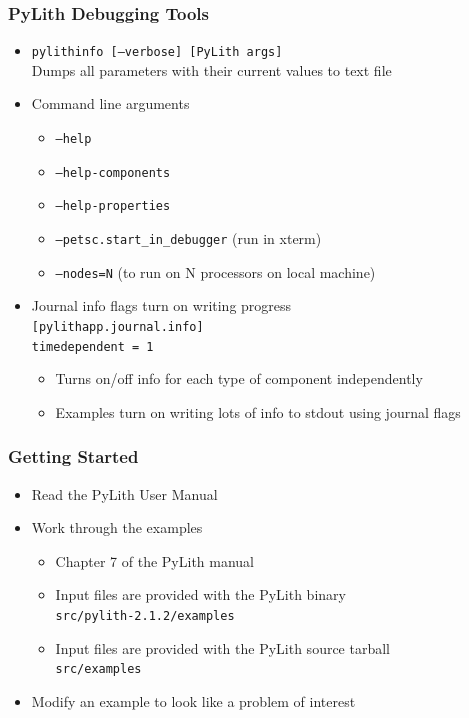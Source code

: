 \documentclass{beamer}
\newcommand{\important}[1]{{\color{red}#1}}
\begin{document}
\begin{frame}
  \frametitle{PyLith Debugging Tools}
  \summary{}

  \begin{itemize}
  \item {\tt pylithinfo [--verbose] [PyLith args]}\\
    Dumps all parameters with their current values to text file
  \item Command line arguments
    \begin{itemize}
    \item {\tt --help}
    \item {\tt --help-components}
    \item {\tt --help-properties}
    \item {\tt --petsc.start\_in\_debugger} (run in xterm)
    \item {\tt --nodes=N} (to run on N processors on local machine)
    \end{itemize}
  \item Journal info flags turn on writing progress\\
    {\tt [pylithapp.journal.info]}\\
    {\tt timedependent = 1} \\
    \begin{itemize}
    \item Turns on/off info for each type of component independently
    \item Examples turn on writing lots of info to stdout using journal flags
    \end{itemize}
  \end{itemize}

\end{frame}


\begin{frame}
  \frametitle{Getting Started}
  \summary{}

  \begin{itemize}
  \item Read the PyLith User Manual
  \item Work through the examples
    \begin{itemize}
    \item \important{Chapter 7} of the PyLith manual
    \item Input files are provided with the PyLith binary\\
      {\tt \important{src/pylith-2.1.2/examples}}
    \item Input files are provided with the PyLith source tarball\\
      {\tt \important{src/examples}}
    \end{itemize}
  \item Modify an example to look like a problem of interest
  \end{itemize}

\end{frame}


\end{document}
